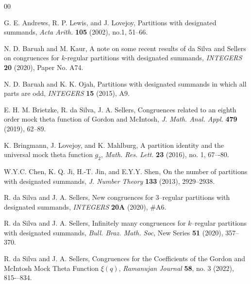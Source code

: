 \documentclass{amsart}
\begin{document}
\begin{thebibliography}{00}





 G. E. Andrews, R. P. Lewis, and J. Lovejoy, 
Partitions with designated summands, {\it Acta Arith.} {\bf 105} (2002), no.1, 51–66.

  N. D. Baruah and M. Kaur, A note on some recent results of da Silva and Sellers on congruences for $k$-regular partitions with designated summands, {\it INTEGERS} {\bf 20} (2020), Paper No. A74.


  N. D. Baruah and K. K. Ojah, Partitions with designated summands in which all parts are odd, {\it INTEGERS} {\bf 15} (2015), A9.


 E. H. M. Brietzke, R. da Silva, J. A. Sellers, Congruences related to an eighth order mock theta function of Gordon and McIntosh, {\it J. Math. Anal. Appl.} {\bf 479} (2019), 62--89.

  K. Bringmann, J. Lovejoy, and K. Mahlburg, A partition identity and the universal mock theta function $g_2$, {\it Math. Res. Lett.} {\bf 23} (2016), no. 1, 67–-80.

W.Y.C. Chen, K. Q. Ji, H.-T. Jin, and E.Y.Y. Shen, On the number of partitions with designated summands, {\it J. Number Theory} {\bf 133} (2013), 2929--2938.  

R. da Silva and J. A. Sellers, New congruences for 3--regular partitions with designated summands, {\it INTEGERS} {\bf 20A} (2020), \#A6. 

R. da Silva and J. A. Sellers, Infinitely many congruences for $k$--regular partitions with designated summands, {\it Bull. Braz. Math. Soc}, New Series {\bf 51} (2020), 357--370.

R. da Silva and J. A. Sellers, Congruences for the Coefficients of the Gordon and McIntosh Mock Theta Function $\xi(q)$, {\it Ramanujan Journal} {\bf 58}, no. 3 (2022), 815-–834.


\end{thebibliography}
\end{document}
